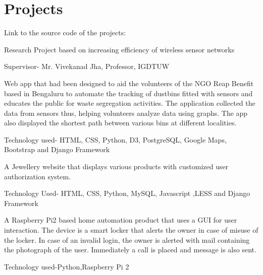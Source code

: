 \documentclass[]{deedy-resume-openfont}
\begin{document}
\begin{minipage}[t]{0.66\textwidth}
\section{Projects}

Link to the source code of the projects: \href{https://github.com/tanvi-surana}{} \sectionsep

Research Project based on increasing efficiency of wireless sensor networks
\sectionsep
\begin{tightemize} 
\item Supervisor- Mr. Vivekanad Jha, Professor, IGDTUW
\end{tightemize}
\sectionsep

Web app that had been designed to aid the volunteers of the NGO Reap Benefit based in Bengaluru to automate the tracking of dustbins fitted with sensors and educates the public for waste segregation activities. The application collected the data from sensors thus, helping volunteers analyze data using graphs. The app also displayed the shortest path between various bins at different localities. \\
\sectionsep
\begin{tightemize}
\item Technology used- HTML, CSS, Python, D3, PostgreSQL, Google Maps, Bootstrap and Django Framework
\end{tightemize}
\sectionsep


A Jewellery website that displays various products with customized user authorization system.
\begin{tightemize}
\item Technology Used- HTML, CSS, Python, MySQL, Javascript ,LESS and Django Framework
\end{tightemize}
\sectionsep

A Raspberry Pi2 based home automation product that uses a GUI for user interaction. The device is a smart locker that alerts the owner in case of misuse of the locker. In case of an invalid login, the owner is alerted with mail containing the photograph of the user. Immediately a call is placed and message is also sent. \\
\begin{tightemize}
\item Technology used-Python,Raspberry Pi 2
\end{tightemize}
\sectionsep




\end{minipage}
\end{document}
